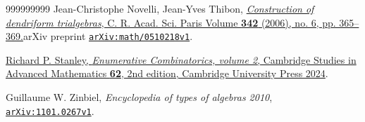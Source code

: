 \documentclass
[numbers=enddot,12pt,final,onecolumn,notitlepage,abstracton]{scrartcl}%
\theoremstyle{definition}
\begin{document}
\begin{thebibliography}{999999999}
Jean-Christophe Novelli, Jean-Yves Thibon,
\href{https://www.numdam.org/item/CRMATH_2006__342_6_365_0/}{\textit{Construction
of dendriform trialgebras}, C. R. Acad. Sci. Paris Volume \textbf{342} (2006),
no. 6, pp. 365--369.}\newline arXiv preprint
\texttt{\href{https://arxiv.org/abs/math/0510218v1}{arXiv:math/0510218v1}}.

%
\href{https://doi.org/10.1017/9781009262538}{Richard P. Stanley,
\textit{Enumerative Combinatorics, volume 2}, Cambridge Studies in Advanced
Mathematics \textbf{62}, 2nd edition, Cambridge University Press 2024}.

Guillaume W. Zinbiel, \textit{Encyclopedia of
types of algebras 2010},
\texttt{\href{https://arxiv.org/abs/1101.0267v1}{arXiv:1101.0267v1}}.
\end{thebibliography}
\end{document}
